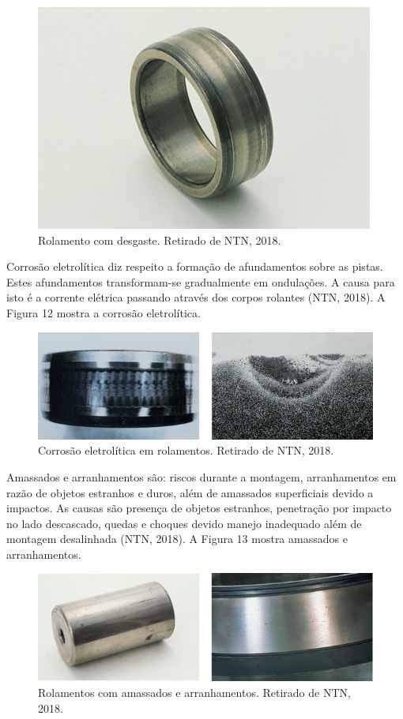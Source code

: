 \documentclass[
	12pt,				
	oneside,			
	a4paper,			
	english,			
	brazil				
	]{abntex2ppgsi}
\begin{document}
\begin{figure}[!htb]
\centering
\includegraphics{Figura11}
\caption {Rolamento com desgaste. Retirado de NTN, 2018.}
\label{Figura11}
\end{figure}

Corrosão eletrolítica diz respeito a formação de afundamentos sobre as pistas. Estes afundamentos transformam-se gradualmente em ondulações. A causa para isto é a corrente elétrica passando através dos corpos rolantes (NTN, 2018). A Figura 12 mostra a corrosão eletrolítica. 

\begin{figure}[!htb]
\centering
\includegraphics{Figura12}
\caption {Corrosão eletrolítica em rolamentos. Retirado de NTN, 2018.}
\label{Figura12}
\end{figure}

Amassados e arranhamentos são: riscos durante a montagem, arranhamentos em razão de objetos estranhos e duros, além de amassados superficiais devido a impactos. As causas são presença de objetos estranhos, penetração por impacto no lado descascado, quedas e choques devido manejo inadequado além de montagem desalinhada (NTN, 2018). A Figura 13 mostra amassados e arranhamentos. 

\begin{figure}[!htb]
\centering
\includegraphics{Figura13}
\caption {Rolamentos com amassados e arranhamentos. Retirado de NTN, 2018.}
\label{Figura13}
\end{figure}
\end{document}
